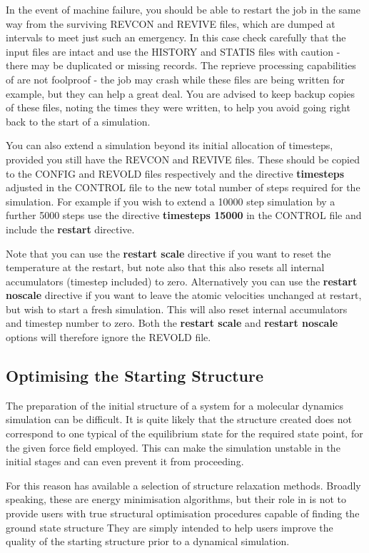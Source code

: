 {{In the event of machine failure, you should be able to restart the job
in the same way from the surviving REVCON and REVIVE files, which are
dumped at intervals to meet just such an emergency. In this case check
carefully that the input files are intact and use the HISTORY and
STATIS files with caution - there may be duplicated or missing
records. The reprieve processing capabilities of \D{} are not foolproof
- the job may crash while these files are being written for example,
but they can help a great deal. You are advised to keep
backup copies of these files, noting the times they were written, to
help you avoid going right back to the start of a simulation.

You can also extend a simulation beyond its initial allocation of
timesteps, provided you still have the REVCON and REVIVE files. These
should be copied to the CONFIG and REVOLD files respectively and the
directive {\bf timesteps} adjusted in the CONTROL file to the new
total number of steps required for the simulation. For example if you
wish to extend a 10000 step simulation by a further 5000 steps use the
directive {\bf timesteps 15000} in the CONTROL file and include the
{\bf restart} directive. 

Note that you can use the {\bf restart scale} directive if you want to reset
the temperature at the restart, but note also that this also resets all
internal accumulators (timestep included) to zero. Alternatively you can use
the {\bf restart noscale} directive if you want to leave the atomic velocities
unchanged at restart, but wish to start a fresh simulation. This will also
reset internal accumulators and timestep number to zero. Both the {\bf restart
  scale} and {\bf restart noscale} options will therefore ignore the REVOLD
file.

\subsection{Optimising the Starting Structure}
\label{minimisation}
The preparation of the initial structure of a system for a molecular
dynamics simulation can be difficult. It is quite likely that the
structure created does not correspond to one typical of the
equilibrium state for the required state point, for the given force
field employed. This can make the simulation unstable in the initial
stages and can even prevent it from proceeding.

For this reason \D{} has available a selection of structure relaxation
methods. Broadly speaking, these are energy minimisation algorithms,
but their role in \D{} is not to provide users with true structural
optimisation procedures capable of finding the ground state structure
They are simply intended to help users improve the quality of the
starting structure prior to a dynamical simulation.

}}
